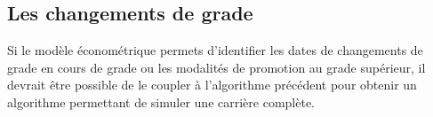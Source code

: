 \documentclass[11pt,a4paper]{article}
\begin{document}
\subsection{Les changements de grade}

Si le modèle économétrique permets d'identifier les dates de changements de grade en cours de grade ou les modalités de promotion au grade supérieur, il devrait être possible de le coupler à l'algorithme précédent pour obtenir un algorithme permettant de simuler une carrière complète.






\ifx\isEmbedded\undefined
\newpage
 

\end{document}

